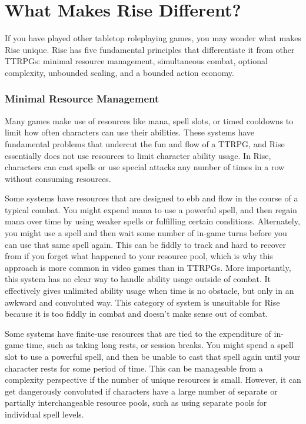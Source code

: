 \chapter{What Makes Rise Different?}
  If you have played other tabletop roleplaying games, you may wonder what makes Rise unique.
  Rise has five fundamental principles that differentiate it from other TTRPGs: minimal resource management, simultaneous combat, optional complexity, unbounded scaling, and a bounded action economy.

  \subsection{Minimal Resource Management}
    Many games make use of resources like mana, spell slots, or timed cooldowns to limit how often characters can use their abilities.
    These systems have fundamental problems that undercut the fun and flow of a TTRPG, and Rise essentially does not use resources to limit character ability usage.
    In Rise, characters can cast spells or use special attacks any number of times in a row without consuming resources.

    Some systems have resources that are designed to ebb and flow in the course of a typical combat.
    You might expend mana to use a powerful spell, and then regain mana over time by using weaker spells or fulfilling certain conditions.
    Alternately, you might use a spell and then wait some number of in-game turns before you can use that same spell again.
    This can be fiddly to track and hard to recover from if you forget what happened to your resource pool, which is why this approach is more common in video games than in TTRPGs.
    More importantly, this system has no clear way to handle ability usage outside of combat.
    It effectively gives unlimited ability usage when time is no obstacle, but only in an awkward and convoluted way.
    This category of system is unsuitable for Rise because it is too fiddly in combat and doesn't make sense out of combat.

    Some systems have finite-use resources that are tied to the expenditure of in-game time, such as taking long rests, or session breaks.
    You might spend a spell slot to use a powerful spell, and then be unable to cast that spell again until your character rests for some period of time.
    This can be manageable from a complexity perspective if the number of unique resources is small.
    However, it can get dangerously convoluted if characters have a large number of separate or partially interchangeable resource pools, such as using separate pools for individual spell levels.


